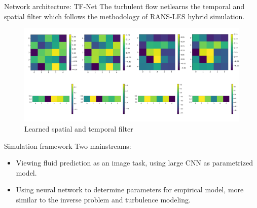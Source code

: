 \documentclass{beamer}
\begin{document}
\begin{frame}{Network architecture: TF-Net}
	The turbulent flow net\footnotemark  learns the temporal and spatial
	filter which follows the methodology of RANS-LES hybrid simulation.
	\begin{figure}[ht]
		\centering
		\centerline{\includegraphics[width=1\linewidth]{fig/filterlearned.png}}
		\caption{Learned spatial and temporal filter\footnotemark}
\end{figure}
	
\end{frame}

\begin{frame}{Simulation framework}
	Two mainstreams:
	\begin{itemize}
		\item Viewing fluid prediction as an image task, using large
		CNN as parametrized model\footnotemark.
		\item Using neural network to determine parameters for empirical model\footnotemark, more similar to the inverse problem and turbulence modeling.
	\end{itemize}
\end{frame}
\end{document}
